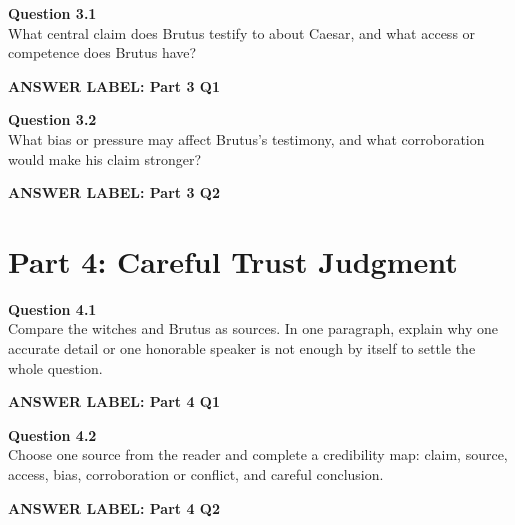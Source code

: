 \documentclass[12pt]{article}
\newcommand{\answerbox}[2]{%
\vspace{0.12em}
\noindent\textbf{#1}\par
\vspace{0.04em}
\noindent\fbox{%
\begin{minipage}[t][#2]{\dimexpr\textwidth-2\fboxsep-2\fboxrule}
\rule{\textwidth}{0pt}
\vspace{#2}
\end{minipage}}
\par\vspace{0.22em}}
\begin{document}
\textbf{Question 3.1}\\[-0.15em]
What central claim does Brutus testify to about Caesar, and what access or competence does Brutus have?

\answerbox{ANSWER LABEL: Part 3 Q1}{2.35in}

\textbf{Question 3.2}\\[-0.15em]
What bias or pressure may affect Brutus's testimony, and what corroboration would make his claim stronger?

\answerbox{ANSWER LABEL: Part 3 Q2}{2.55in}

\newpage

\section*{Part 4: Careful Trust Judgment}

\textbf{Question 4.1}\\[-0.15em]
Compare the witches and Brutus as sources. In one paragraph, explain why one accurate detail or one honorable speaker is not enough by itself to settle the whole question.

\answerbox{ANSWER LABEL: Part 4 Q1}{2.65in}

\textbf{Question 4.2}\\[-0.15em]
Choose one source from the reader and complete a credibility map: claim, source, access, bias, corroboration or conflict, and careful conclusion.

\answerbox{ANSWER LABEL: Part 4 Q2}{2.55in}
\end{document}

